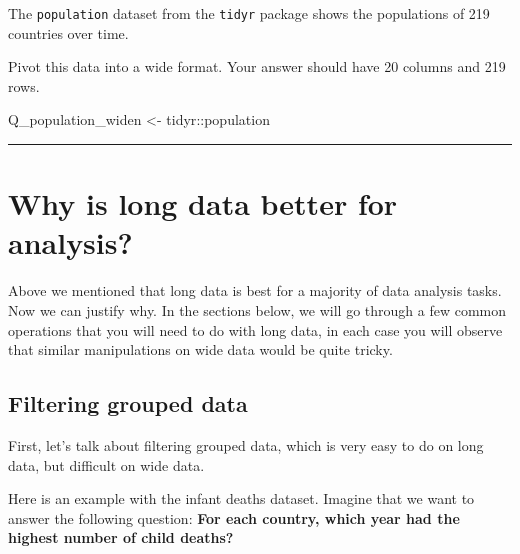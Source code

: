 \documentclass[
  letterpaper,
  DIV=11,
  numbers=noendperiod]{scrreprt}
\newenvironment{Shaded}{\begin{snugshade}}{\end{snugshade}}
\newcommand{\NormalTok}[1]{\textcolor[rgb]{0.00,0.23,0.31}{#1}}
\newcommand{\OtherTok}[1]{\textcolor[rgb]{0.00,0.23,0.31}{#1}}
\newcommand{\SpecialCharTok}[1]{\textcolor[rgb]{0.37,0.37,0.37}{#1}}
\begin{document}
\begin{tcolorbox}[enhanced jigsaw, titlerule=0mm, colback=white, left=2mm, breakable, opacitybacktitle=0.6, colbacktitle=quarto-callout-tip-color!10!white, colframe=quarto-callout-tip-color-frame, bottomtitle=1mm, opacityback=0, coltitle=black, arc=.35mm, toptitle=1mm, title=\textcolor{quarto-callout-tip-color}{\faLightbulb}\hspace{0.5em}{Practice}, leftrule=.75mm, toprule=.15mm, bottomrule=.15mm, rightrule=.15mm]

The \texttt{population} dataset from the \texttt{tidyr} package shows
the populations of 219 countries over time.

Pivot this data into a wide format. Your answer should have 20 columns
and 219 rows.

\begin{Shaded}
\begin{Highlighting}[]
\NormalTok{Q\_population\_widen }\OtherTok{\textless{}{-}} 
\NormalTok{  tidyr}\SpecialCharTok{::}\NormalTok{population}
\end{Highlighting}
\end{Shaded}

\end{tcolorbox}

\begin{center}\rule{0.5\linewidth}{0.5pt}\end{center}

\section{Why is long data better for
analysis?}\label{why-is-long-data-better-for-analysis}

Above we mentioned that long data is best for a majority of data
analysis tasks. Now we can justify why. In the sections below, we will
go through a few common operations that you will need to do with long
data, in each case you will observe that similar manipulations on wide
data would be quite tricky.

\subsection{Filtering grouped data}\label{filtering-grouped-data}

First, let's talk about filtering grouped data, which is very easy to do
on long data, but difficult on wide data.

Here is an example with the infant deaths dataset. Imagine that we want
to answer the following question: \textbf{For each country, which year
had the highest number of child deaths?}
\end{document}
